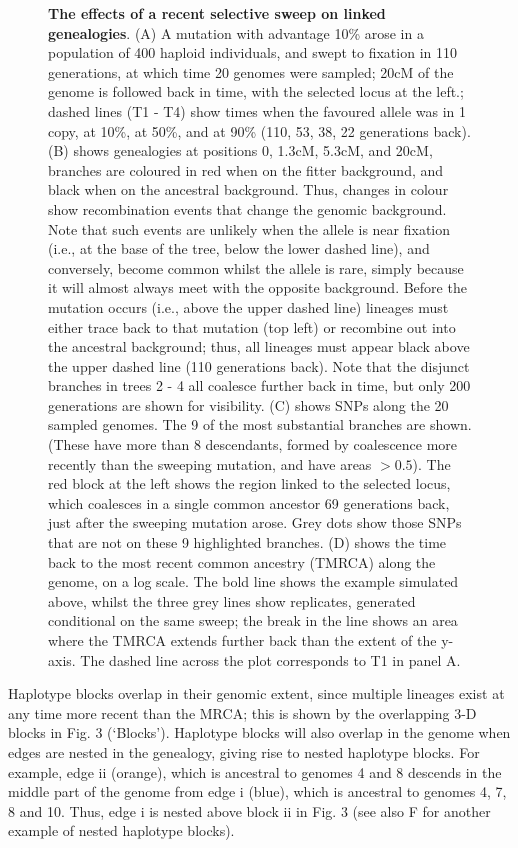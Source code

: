 \documentclass[twocolumn]{bmcart}%
\begin{document}
\begin{figure}
    \caption{\footnotesize{\textbf{The effects of a recent selective sweep on linked genealogies}. (A) A mutation with advantage 10\% arose in a population of 400 haploid individuals, and swept to fixation in 110 generations, at which time 20 genomes were sampled; 20cM of the genome is followed back in time, with the selected locus at the left.; dashed lines (T1 - T4) show times when the favoured allele was in 1 copy, at 10\%, at 50\%, and at 90\% (110, 53, 38, 22 generations back). (B) shows genealogies at positions 0, 1.3cM, 5.3cM, and 20cM, branches are coloured in red when on the fitter background, and black when on the ancestral background. Thus, changes in colour show recombination events that change the genomic background. Note that such events are unlikely when the allele is near fixation (i.e., at the base of the tree, below the lower dashed line), and conversely, become common whilst the allele is rare, simply because it will almost always meet with the opposite background. Before the mutation occurs (i.e., above the upper dashed line) lineages must either trace back to that mutation (top left) or recombine out into the ancestral background; thus, all lineages must appear black above the upper dashed line (110 generations back). Note that the disjunct branches in trees 2 - 4 all coalesce further back in time, but only 200 generations are shown for visibility. (C) shows SNPs along the 20 sampled genomes. The 9 of the most substantial branches are shown. (These have more than 8 descendants, formed by coalescence more recently than the sweeping mutation, and have areas $>0.5$). The red block at the left shows the region linked to the selected locus, which coalesces in a single common ancestor 69 generations back, just after the sweeping mutation arose. Grey dots show those SNPs that are not on these 9 highlighted branches. (D) shows the time back to the most recent common ancestry (TMRCA) along the genome, on a log scale. The bold line shows the example simulated above, whilst the three grey lines show replicates, generated conditional on the same sweep; the break in the line shows an area where the TMRCA extends further back than the extent of the y-axis. The dashed line across the plot corresponds to T1 in panel A.} }
\end{figure}

Haplotype blocks overlap in their genomic extent, since multiple lineages exist at any time more recent than the MRCA; this is shown by the overlapping 3-D blocks in Fig. 3 (‘Blocks’). Haplotype blocks will also overlap in the genome when edges are nested in the genealogy, giving rise to nested haplotype blocks. For example, edge ii (orange), which is ancestral to genomes 4 and 8 descends in the middle part of the genome from edge i (blue), which is ancestral to genomes 4, 7, 8 and 10. Thus, edge i is nested above block ii in Fig. 3 (see also F for another example of nested haplotype blocks). 
\end{document}
